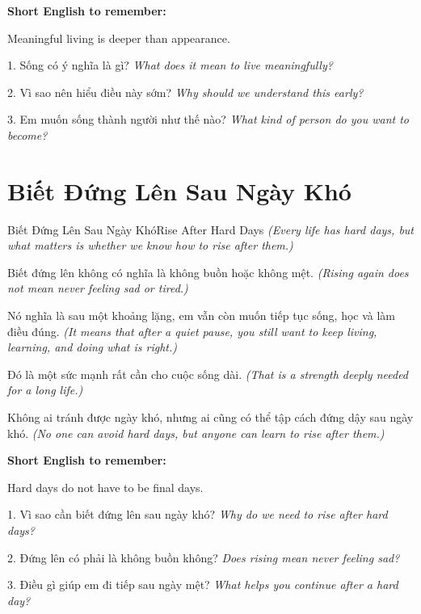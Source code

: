 \begin{ghinhoanh}
\textbf{Short English to remember:}

Meaningful living is deeper than appearance.

\end{ghinhoanh}

\begin{tuhocnhanh}
1. Sống có ý nghĩa là gì? \textit{What does it mean to live meaningfully?}

2. Vì sao nên hiểu điều này sớm? \textit{Why should we understand this early?}

3. Em muốn sống thành người như thế nào? \textit{What kind of person do you want to become?}
\end{tuhocnhanh}
\ngancach

\section{Biết Đứng Lên Sau Ngày Khó}
\begin{truyen}{Biết Đứng Lên Sau Ngày Khó}{Rise After Hard Days}
\textit{(Every life has hard days, but what matters is whether we know how to rise after them.)}

Biết đứng lên không có nghĩa là không buồn hoặc không mệt.
\textit{(Rising again does not mean never feeling sad or tired.)}

Nó nghĩa là sau một khoảng lặng, em vẫn còn muốn tiếp tục sống, học và làm điều đúng.
\textit{(It means that after a quiet pause, you still want to keep living, learning, and doing what is right.)}

Đó là một sức mạnh rất cần cho cuộc sống dài.
\textit{(That is a strength deeply needed for a long life.)}
\end{truyen}

\begin{baihoc}
Không ai tránh được ngày khó, nhưng ai cũng có thể tập cách đứng dậy sau ngày khó.
\textit{(No one can avoid hard days, but anyone can learn to rise after them.)}
\end{baihoc}

\begin{ghinhoanh}
\textbf{Short English to remember:}

Hard days do not have to be final days.

\end{ghinhoanh}

\begin{tuhocnhanh}
1. Vì sao cần biết đứng lên sau ngày khó? \textit{Why do we need to rise after hard days?}

2. Đứng lên có phải là không buồn không? \textit{Does rising mean never feeling sad?}

3. Điều gì giúp em đi tiếp sau ngày mệt? \textit{What helps you continue after a hard day?}
\end{tuhocnhanh}
\ngancach